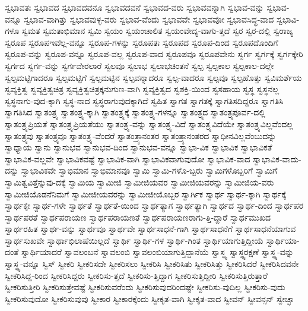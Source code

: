 {ಸ್ವಭಾವತಃ
ಸ್ವಭಾವದ
ಸ್ವಭಾವದವನೂ
ಸ್ವಭಾವದವನೆ
ಸ್ವಭಾವದ-ವರು
ಸ್ವಭಾವವನ್ನಾಗಿ
ಸ್ವಭಾವ-ವನ್ನು
ಸ್ವಭಾವ-ವನ್ನೂ
ಸ್ವಭಾವ-ವಾಗಿತ್ತು
ಸ್ವಭಾವವುಳ್ಳ-ವರು
ಸ್ವಭಾವ-ವೆಂದು
ಸ್ವಭಾವವೇ
ಸ್ವಭಾವವೋ
ಸ್ವಭಾವಸಿದ್ಧ-ವಾದ
ಸ್ವಭಾವಿ-ಗಳೂ
ಸ್ವಮತ
ಸ್ವಮತಾಭಿಮಾನ
ಸ್ವಮಿ
ಸ್ವಯಂ
ಸ್ವಯಂಚಾಲಿತ
ಸ್ವಯಂವೇದ್ಯ-ವಾಗು-ತ್ತದೆ
ಸ್ವರ
ಸ್ವರ-ದಲ್ಲಿ
ಸ್ವರಾಜ್ಯ
ಸ್ವರೂಪ
ಸ್ವರೂಪಇವೆಲ್ಲ-ವನ್ನೂ
ಸ್ವರೂಪ-ಗಳನ್ನು
ಸ್ವರೂಪತಃ
ಸ್ವರೂಪದ
ಸ್ವರೂಪ-ದಿಂದ
ಸ್ವರೂಪದೊಂದಿಗೆ
ಸ್ವರೂಪ-ವನ್ನು
ಸ್ವರೂಪ-ವನ್ನೂ
ಸ್ವರೂಪ-ವಲ್ಲ
ಸ್ವರೂಪ-ವಾದ
ಸ್ವರೂಪವೂ
ಸ್ವರೂಪವೇನು
ಸ್ವರ್ಗ
ಸ್ವರ್ಗಕ್ಕೆ
ಸ್ವರ್ಗಕ್ಕೇರಿ
ಸ್ವರ್ಗದ
ಸ್ವರ್ಗ-ವನ್ನು
ಸ್ವರ್ಗವೇರಲಾರೆ
ಸ್ವಲವೂ
ಸ್ವಲಾಭ
ಸ್ವಲಾಭಚಿಂತನೆ
ಸ್ವಲ್ಪ
ಸ್ವಲ್ಪಕಾಲ
ಸ್ವಲ್ಪಕಾಲ-ದಲ್ಲೇ
ಸ್ವಲ್ಪಮಟ್ಟಿಗಾದರೂ
ಸ್ವಲ್ಪಮಟ್ಟಿಗೆ
ಸ್ವಲ್ಪಮಟ್ಟಿನ
ಸ್ವಲ್ಪವನ್ನಾದರೂ
ಸ್ವಲ್ಪ-ವಾದರೂ
ಸ್ವಲ್ಪವೂ
ಸ್ವಲ್ಪಹೊತ್ತು
ಸ್ವವಿಮರ್ಶೆಯ
ಸ್ವವ್ಯಕ್ತಿತ್ವ
ಸ್ವವ್ಯಕ್ತಿತ್ವಚಿತ್ರ
ಸ್ವವ್ಯಕ್ತಿತ್ವಚಿತ್ರಕ್ಕನುಗುಣ-ವಾಗಿ
ಸ್ವವ್ಯಕ್ತಿತ್ವದ
ಸ್ವಶಕ್ತಿ-ಯಿಂದ
ಸ್ವಸಹಾಯ
ಸ್ವಸ್ಥ
ಸ್ವಸ್ಥನಲ್ಲ
ಸ್ವಸ್ಥನಾಗು-ವುದ-ಕ್ಕಾಗಿ
ಸ್ವಸ್ಥ-ನಾದ
ಸ್ವಸ್ಥರಾಗುವುದಕ್ಕಾಗಿದೆ
ಸ್ವಹಿತ
ಸ್ವಾಗತ
ಸ್ವಾಗತಕ್ಕೆ
ಸ್ವಾಗತಿಸದಿದ್ದರೂ
ಸ್ವಾಗತಿಸಿ
ಸ್ವಾಗತಿಸಿದ
ಸ್ವಾತಂತ್ರ್ಯ
ಸ್ವಾತಂತ್ರ್ಯ-ಕ್ಕಾಗಿ
ಸ್ವಾತಂತ್ರ್ಯಕ್ಕೆ
ಸ್ವಾತಂತ್ರ್ಯ-ಗಳನ್ನೂ
ಸ್ವಾತಂತ್ರ್ಯದ
ಸ್ವಾತಂತ್ರ್ಯಪೂರ್ವ-ದಲ್ಲಿ
ಸ್ವಾತಂತ್ರ್ಯಪ್ರಿಯತೆ
ಸ್ವಾತಂತ್ರ್ಯಪ್ರಿಯತೆಯು
ಸ್ವಾತಂತ್ರ್ಯ-ವನ್ನು
ಸ್ವಾತಂತ್ರ್ಯ-ವಿದೆ
ಸ್ವಾತಂತ್ರ್ಯವಿದೆಯೇ
ಸ್ವಾತಂತ್ರ್ಯವಿಲ್ಲವೆಂದಲ್ಲ
ಸ್ವಾತಂತ್ರ್ಯವು
ಸ್ವಾತಂತ್ರ್ಯವೂ
ಸ್ವಾತಂತ್ರ್ಯ-ವೆಂದರೆ
ಸ್ವಾತಂತ್ರ್ಯಾನಂತರ
ಸ್ವಾತಂತ್ರ್ಯಾನಂತರದ
ಸ್ವಾಧೀನವಿಲ್ಲವೆಂಬುದನ್ನು
ಸ್ವಾಧ್ಯಾಯ
ಸ್ವಾನು
ಸ್ವಾನುಭವ
ಸ್ವಾನುಭವ-ದಿಂದ
ಸ್ವಾನುಭವ-ವನ್ನೂ
ಸ್ವಾಭಾ-ವಿಕ
ಸ್ವಾಭಾವಿಕ
ಸ್ವಾಭಾವಿಕತೆ
ಸ್ವಾಭಾವಿಕ-ವಲ್ಲವೇ
ಸ್ವಾಭಾವಿಕವಷ್ಟೆ
ಸ್ವಾಭಾವಿಕ-ವಾಗಿ
ಸ್ವಾಭಾವಿಕವಾಗುವುದೋ
ಸ್ವಾಭಾವಿಕ-ವಾದ
ಸ್ವಾಭಾವಿಕ-ವಾದು-ದನ್ನು
ಸ್ವಾಭಾವಿಕವೇ
ಸ್ವಾಭಿಮಾನ
ಸ್ವಾಭಿಮಾನವೂ
ಸ್ವಾಮಿ
ಸ್ವಾಮಿ-ಗಳೊ-ಬ್ಬರು
ಸ್ವಾಮಿಗಳೊಬ್ಬರಿಗೆ
ಸ್ವಾಮಿಗೆ
ಸ್ವಾಮಿತ್ವವಿತ್ತೆನ್ನುವು-ದಕ್ಕೆ
ಸ್ವಾಮಿಯ
ಸ್ವಾಮೀಜಿ
ಸ್ವಾಮೀಜಿಯವರ
ಸ್ವಾಮೀಜಿಯವರನ್ನು
ಸ್ವಾಮೀಜಿಯ-ವರು
ಸ್ವಾಮೀಜಿಯೊಡನೆನಿಮಗೆ
ಸ್ವಾಮೀಜೀಯವರನ್ನು
ಸ್ವಾಮೀಜೀಯೊಬ್ಬರ
ಸ್ವಾರ್ಗಿಕ
ಸ್ವಾರ್ಥ
ಸ್ವಾರ್ಥ-ಕ್ಕಾಗಿ
ಸ್ವಾರ್ಥಕ್ಕೆ
ಸ್ವಾರ್ಥಕ್ಕೇ
ಸ್ವಾರ್ಥ-ಗಳೇ
ಸ್ವಾರ್ಥತೆ
ಸ್ವಾರ್ಥತೆ-ಯಿಂದ
ಸ್ವಾರ್ಥತ್ಯಾಗ
ಸ್ವಾರ್ಥತ್ಯಾಗಿ
ಸ್ವಾರ್ಥದ
ಸ್ವಾರ್ಥ-ದಿಂದ
ಸ್ವಾರ್ಥಪರ
ಸ್ವಾರ್ಥಪರತೆ
ಸ್ವಾರ್ಥಪರಾಯಣ
ಸ್ವಾರ್ಥಪರಾಯಣತೆ
ಸ್ವಾರ್ಥಪರಾಯಣರಾಗು-ತ್ತಿ-ದ್ದಾರೆ
ಸ್ವಾರ್ಥಮುಖದ
ಸ್ವಾರ್ಥರಹಿತ
ಸ್ವಾರ್ಥ-ವನ್ನು
ಸ್ವಾರ್ಥವೂ
ಸ್ವಾರ್ಥವೇ
ಸ್ವಾರ್ಥಸಾಧನೆ-ಗಾಗಿ
ಸ್ವಾರ್ಥಸಾಧನೆಗೆ
ಸ್ವಾರ್ಥಸಾಧನೆಯಾಗುವ
ಸ್ವಾರ್ಥಸುಖವೇ
ಸ್ವಾರ್ಥಾಭಿಲಾಷೆಯಿಲ್ಲದೆ
ಸ್ವಾರ್ಥಿ
ಸ್ವಾರ್ಥಿ-ಗಳ
ಸ್ವಾರ್ಥಿ-ಗಿಂತ
ಸ್ವಾರ್ಥಿಯಾಗುತ್ತಿದ್ದೀಯೆ
ಸ್ವಾರ್ಥಿಯಾ-ದಂತೆ
ಸ್ವಾರ್ಥಿಯಾದರೆ
ಸ್ವಾವಲಂಬನೆ
ಸ್ವಾವಲಂಬಿ
ಸ್ವಾವಲಂಬಿಯಾಗುತ್ತಿದ್ದಾನೆಯೆ
ಸ್ವಾಸ್ಥ್ಯ
ಸ್ವಾಸ್ಥ್ಯರಕ್ಷಣೆ
ಸ್ವಾಸ್ಥ್ಯ-ವನ್ನು
ಸ್ವಾಸ್ಥ್ಯ-ವನ್ನೂ
ಸ್ವಿಸ್
ಸ್ವೀಕರಿ
ಸ್ವೀಕರಿಸದೇ
ಸ್ವೀಕರಿಸಲು
ಸ್ವೀಕರಿಸಿ
ಸ್ವೀಕರಿಸಿತು
ಸ್ವೀಕರಿಸಿತ್ತು
ಸ್ವೀಕರಿಸಿದರೆ
ಸ್ವೀಕರಿಸಿದವನೇ
ಸ್ವೀಕರಿಸಿದ್ದ-ರಿಂದ
ಸ್ವೀಕರಿಸಿದ್ದರು
ಸ್ವೀಕರಿಸು-ತ್ತದೆ
ಸ್ವೀಕರಿಸು-ತ್ತಿದ್ದಾಗ
ಸ್ವೀಕರಿಸುತ್ತಿದ್ದೀರಿ
ಸ್ವೀಕರಿಸುತ್ತಿರುತ್ತಾರೆ
ಸ್ವೀಕರಿಸುತ್ತೀರಿ
ಸ್ವೀಕರಿಸುತ್ತೇವಷ್ಟೆ
ಸ್ವೀಕರಿಸುವರೆಂದು
ಸ್ವೀಕರಿಸುವುದರಿಂದಷ್ಟೇ
ಸ್ವೀಕರಿಸು-ವುದಿಲ್ಲ
ಸ್ವೀಕರಿಸು-ವುದು
ಸ್ವೀಕರಿಸುವುದೋ
ಸ್ವೀಕರಿಸುವುವು
ಸ್ವೀಕಾರ
ಸ್ವೀಕಾರಕ್ಕೆಂದು
ಸ್ವೀಕೃತ-ವಾಗಿ
ಸ್ವೀಕೃತ-ವಾದ
ಸ್ವೀವನ್
ಸ್ವೀವನ್ಸನ್
ಸ್ವೇಚ್ಛಾ
}
